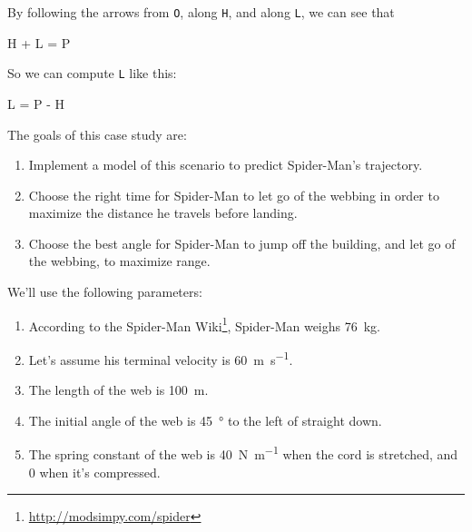 \documentclass[
]{book}
\numberwithin{Answer}{chapter}
\numberwithin{Exercise}{chapter}
\begin{document}

By following the arrows from {\tt O}, along {\tt H}, and along
{\tt L}, we can see that

\begin{code}
H + L = P
\end{code}

So we can compute {\tt L} like this:

\begin{code}
L = P - H
\end{code}

The goals of this case study are:

\begin{enumerate}

\item
  Implement a model of this scenario to predict Spider-Man's trajectory.

\item
  Choose the right time for Spider-Man to let go of the webbing in order
  to maximize the distance he travels before landing.

\item
  Choose the best angle for Spider-Man to jump off the building, and let
  go of the webbing, to maximize range.
  
\end{enumerate}

We'll use the following parameters:

\begin{enumerate}

\item According to the Spider-Man Wiki\footnote{\url{http://modsimpy.com/spider}}, Spider-Man weighs \SI{76}{\kg}.

\item
  Let's assume his terminal velocity is \SI{60}{\meter\per\second}.

\item
  The length of the web is \SI{100}{\meter}.

\item
  The initial angle of the web is \SI{45}{\degree} to the left of straight
  down.

\item
  The spring constant of the web is \SI{40}{\newton\per\meter} when the cord is stretched, and 0 when it's compressed.

\end{enumerate}
\end{document}
